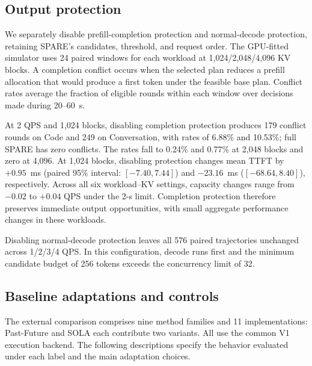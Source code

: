 \subsection{Output protection}
\label{app:output-protection}

We separately disable prefill-completion protection and normal-decode protection, retaining SPARE's candidates, threshold, and request order. The GPU-fitted simulator uses 24 paired windows for each workload at 1,024/2,048/4,096 KV blocks. A completion conflict occurs when the selected plan reduces a prefill allocation that would produce a first token under the feasible base plan. Conflict rates average the fraction of eligible rounds within each window over decisions made during 20--60~s.

At 2 QPS and 1,024 blocks, disabling completion protection produces 179 conflict rounds on Code and 249 on Conversation, with rates of 6.88\% and 10.53\%; full SPARE has zero conflicts. The rates fall to 0.24\% and 0.77\% at 2,048 blocks and zero at 4,096. At 1,024 blocks, disabling protection changes mean TTFT by $+0.95$~ms (paired 95\% interval: $[-7.40,7.44]$) and $-23.16$~ms ($[-68.64,8.40]$), respectively. Across all six workload--KV settings, capacity changes range from $-0.02$ to $+0.04$ QPS under the 2-s limit. Completion protection therefore preserves immediate output opportunities, with small aggregate performance changes in these workloads.

Disabling normal-decode protection leaves all 576 paired trajectories unchanged across 1/2/3/4 QPS. In this configuration, decode runs first and the minimum candidate budget of 256 tokens exceeds the concurrency limit of 32.

\subsection{Baseline adaptations and controls}
\label{app:experimental-baselines}

The external comparison comprises nine method families and 11 implementations: Past-Future and SOLA each contribute two variants. All use the common V1 execution backend. The following descriptions specify the behavior evaluated under each label and the main adaptation choices.

